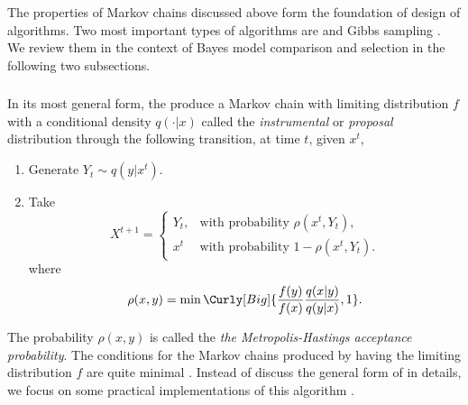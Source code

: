 The properties of Markov chains discussed above form the foundation of design
of \mcmc algorithms. Two most important types of \mcmc algorithms are \mha
\parencite{Hastings1970,Metropolis1953} and Gibbs sampling
\parencite{Geman1993}. We review them in the context of Bayes model comparison
and selection in the following two subsections.

\subsubsection{\mha}
\label{ssub:mha}

In its most general form, the \mha produce a Markov chain with limiting
distribution $f$ with a conditional density $q(\cdot|x)$ called the
\emph{instrumental} or \emph{proposal} distribution through the following
transition, at time $t$, given $x^t$,
\begin{enumerate}
  \item Generate $Y_t \sim q(y|x^t)$.
  \item Take
    \[
      X^{t+1} = \begin{cases}
        Y_t, &\text{with probability } \rho(x^t,Y_t),\\
        x^t  &\text{with probability } 1 - \rho(x^t,Y_t).
      \end{cases}
    \]
    where
    \begin{equation}
      \rho(x,y) = \min\Curly[Big]{\frac{f(y)}{f(x)}\frac{q(x|y)}{q(y|x)},1}.
    \end{equation}
\end{enumerate}
The probability $\rho(x,y)$ is called the \emph{the Metropolis-Hastings
  acceptance probability}. The conditions for the Markov chains produced by
\mha having the limiting distribution $f$ are quite minimal
\parencite[see][chap.~7]{Robert2004}. Instead of discuss the general form of
\mha in details, we focus on some practical implementations of this algorithm
\parencite[also see][for the speed of convergence of the \mha]{Mengersen1996}.

